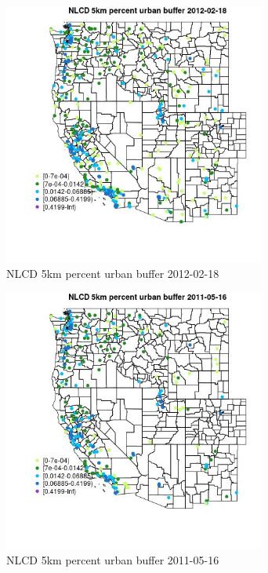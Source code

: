 \begin{figure} 
\centering  
\includegraphics[width=0.77\textwidth]{Code_Outputs/Report_ML_input_PM25_Step4_part_f_de_duplicated_aves_prioritize_24hr_obswNAs_MapObsNLCD_5km_percent_urban_buffer2012-02-18.jpg} 
\caption{\label{fig:Report_ML_input_PM25_Step4_part_f_de_duplicated_aves_prioritize_24hr_obswNAsMapObsNLCD_5km_percent_urban_buffer2012-02-18}NLCD 5km percent urban buffer 2012-02-18} 
\end{figure} 
 

\begin{figure} 
\centering  
\includegraphics[width=0.77\textwidth]{Code_Outputs/Report_ML_input_PM25_Step4_part_f_de_duplicated_aves_prioritize_24hr_obswNAs_MapObsNLCD_5km_percent_urban_buffer2011-05-16.jpg} 
\caption{\label{fig:Report_ML_input_PM25_Step4_part_f_de_duplicated_aves_prioritize_24hr_obswNAsMapObsNLCD_5km_percent_urban_buffer2011-05-16}NLCD 5km percent urban buffer 2011-05-16} 
\end{figure} 
 

